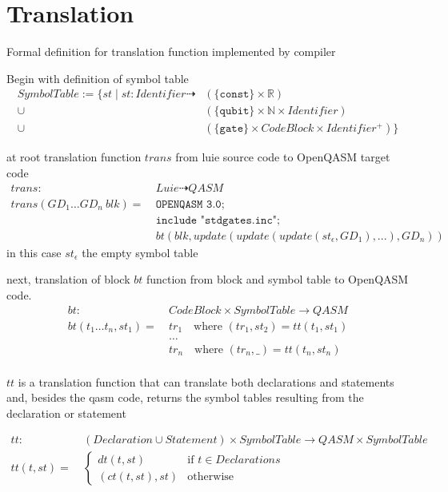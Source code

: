 \section{Translation}
\label{sec:concept_translation}
Formal definition for translation function implemented by compiler

Begin with definition of symbol table
\begin{align*}
    SymbolTable := \{st \mid st : Identifier \dashrightarrow &(\{\texttt{const}\} \times \mathbb{R})\\
                                                    \cup    &(\{\texttt{qubit}\} \times \mathbb{N} \times Identifier)\\
                                                    \cup    &(\{\texttt{gate}\} \times CodeBlock \times Identifier^+)
                                                    \}
\end{align*}

at root translation function $trans$ from luie source code to OpenQASM target code
\begin{align*}
    trans : \ & Luie \dashrightarrow QASM\\
    trans(GD_1 \dots GD_n \ blk) = \ & \texttt{OPENQASM 3.0;}\\
                & \texttt{include "stdgates.inc";}\\
                & bt(blk, update(update(update(st_\epsilon, GD_1), ...), GD_n))
\end{align*}  
in this case $st_\epsilon$ the empty symbol table

next, translation of block $bt$ function from block and symbol table to OpenQASM code.  
\begin{align*}
    bt : \ & CodeBlock \times SymbolTable \to QASM\\
    bt(t_1 \dots t_n, st_1) = \ &  tr_1 \quad \text{where } (tr_1, st_2) = tt(t_1, st_1)\\
    & \dots\\
    & tr_n \quad \text{where } (tr_n, \_) = tt(t_n, st_n)\\
\end{align*}

$tt$ is a translation function that can translate both declarations and statements and, besides the qasm code, returns the symbol tables resulting from the declaration or statement

\begin{align*}
    tt : \ & (Declaration \cup Statement) \times SymbolTable \to QASM \times SymbolTable\\
    tt(t, st) = \ & \begin{cases}
        dt(t, st)  \quad &\text{if } t \in Declarations\\
        (ct(t, st), st) &\text{otherwise }
    \end{cases}  
\end{align*}


